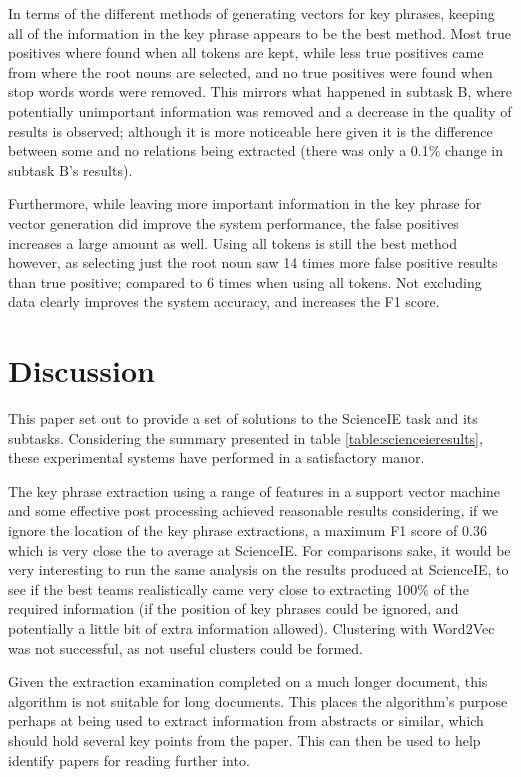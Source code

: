 In terms of the different methods of generating vectors for key phrases, keeping all of the information in the key phrase appears to be the best method. Most true positives where found when all tokens are kept, while less true positives came from where the root nouns are selected, and no true positives were found when stop words words were removed. This mirrors what happened in subtask B, where potentially unimportant information was removed and a decrease in the quality of results is observed; although it is more noticeable here given it is the difference between some and no relations being extracted (there was only a 0.1\% change in subtask B's results).

Furthermore, while leaving more important information in the key phrase for vector generation did improve the system performance, the false positives increases a large amount as well. Using all tokens is still the best method however, as selecting just the root noun saw 14 times more false positive results than true positive; compared to 6 times when using all tokens. Not excluding data clearly improves the system accuracy, and increases the F1 score.

\section{Discussion}
This paper set out to provide a set of solutions to the ScienceIE task and its subtasks. Considering the summary presented in table \ref{table:scienceieresults}, these experimental systems have performed in a satisfactory manor. 

The key phrase extraction using a range of features in a support vector machine and some effective post processing achieved reasonable results considering, if we ignore the location of the key phrase extractions, a maximum F1 score of 0.36 which is very close the to average at ScienceIE. For comparisons sake, it would be very interesting to run the same analysis on the results produced at ScienceIE, to see if the best teams realistically came very close to extracting 100\% of the required information (if the position of key phrases could be ignored, and potentially a little bit of extra information allowed). Clustering with Word2Vec was not successful, as not useful clusters could be formed. 

Given the extraction examination completed on a much longer document, this algorithm is not suitable for long documents. This places the algorithm's purpose perhaps at being used to extract information from abstracts or similar, which should hold several key points from the paper. This can then be used to help identify papers for reading further into.

